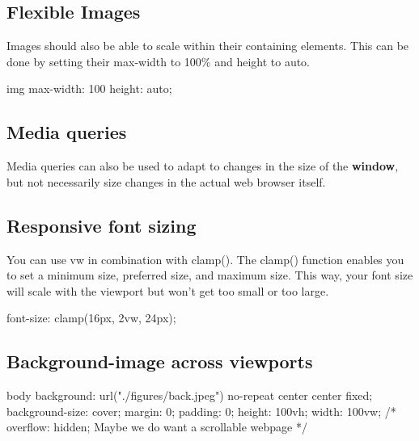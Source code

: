 \documentclass{report}
\begin{document}
    \bigbreak \noindent 
    \subsection{Flexible Images}
    \bigbreak \noindent 
    Images should also be able to scale within their containing elements. This can be done by setting their max-width to 100\% and height to auto.
    \bigbreak \noindent 
    \begin{csscode}
    img {
        max-width: 100%
        height: auto;
    }
    \end{csscode}

    \bigbreak \noindent 
    \subsection{Media queries}
    \bigbreak \noindent 
    Media queries can also be used to adapt to changes in the size of the \textbf{window}, but not necessarily size changes in the actual web browser itself.

    \bigbreak \noindent 
    \subsection{Responsive font sizing}
    \bigbreak \noindent 
    You can use vw in combination with clamp(). The clamp() function enables you to set a minimum size, preferred size, and maximum size. This way, your font size will scale with the viewport but won't get too small or too large.
    \bigbreak \noindent 
    \begin{csscode}
    font-size: clamp(16px, 2vw, 24px);
    \end{csscode}


    \bigbreak \noindent 
    \subsection{Background-image across viewports}
    \bigbreak \noindent 
    \begin{csscode}
body {
    background: url("./figures/back.jpeg") no-repeat center center fixed;
    background-size: cover;
    margin: 0;
    padding: 0;
    height: 100vh;
    width: 100vw;
    /* overflow: hidden; Maybe we do want a scrollable webpage */
}
    \end{csscode}









    
    










    



























    
\end{document}
